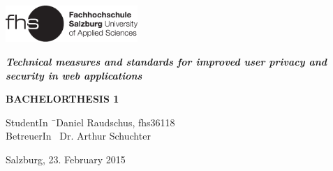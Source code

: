 \begin{titlepage}
\begin{center}

\includegraphics[width=5cm]{images/FHSLogo.pdf}

\vspace*{4cm}

\Large{
	\textit{\textbf{Technical measures and standards for improved user privacy and security in web applications}}
}

\vspace*{4cm}

\large{
	\textbf{BACHELORTHESIS 1}
}

\end{center}

\vfill

\begin{tabbing}
StudentIn \= \ Daniel Raudschus, fhs36118 \\
BetreuerIn \> \ Dr. Arthur Schuchter
\end{tabbing}

Salzburg, 23. February 2015

\end{titlepage}